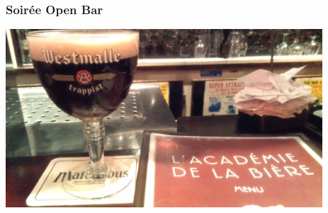 \documentclass{beamer}
\begin{document}
\begin{frame}[fragile]
  \frametitle{Soirée Open Bar}

  \begin{center}
    \includegraphics[height=18em]{academie-de-la-biere.jpg}
  \end{center}
\end{frame}
\end{document}
